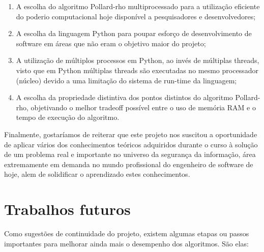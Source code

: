 \begin{enumerate}
\item A escolha do algoritmo Pollard-rho multiprocessado para a utilização eficiente do poderio computacional hoje disponível a pesquisadores e desenvolvedores;

\item A escolha da linguagem Python para poupar esforço de desenvolvimento de
software em áreas que não eram o objetivo maior do projeto;

\item A utilização de múltiplos processos em Python, ao invés de múltiplas threads, visto que em Python múltiplas threads são executadas no mesmo processador (núcleo) devido a uma limitação do sistema de run-time da linguagem;

\item A escolha da propriedade distintiva dos pontos distintos do algoritmo Pollard-rho, objetivando o melhor tradeoff possível entre o uso de memória RAM e o tempo de execução do algoritmo.
\end{enumerate}

Finalmente, gostaríamos de reiterar que este projeto nos suscitou a oportunidade de aplicar vários dos conhecimentos teóricos adquiridos durante o curso à solução de um problema real e importante no universo da segurança da informação, área extremamente em demanda no mundo profissional do engenheiro de software de hoje, alem de solidificar o aprendizado estes conhecimentos.

\section{Trabalhos futuros}
Como sugestões de continuidade do projeto, existem algumas etapas ou passos importantes para melhorar ainda mais o desempenho dos algoritmos. São elas:

